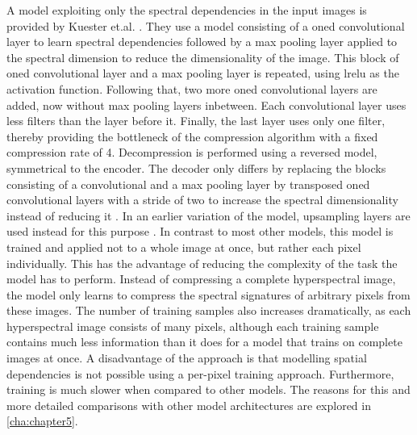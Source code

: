 A model exploiting only the spectral dependencies in the input images is provided by Kuester et.al. \citep{kuester_1d-convolutional_2021,kuester_transferability_2022}. They use a model consisting of a \ac{oned} convolutional layer to learn spectral dependencies followed by a max pooling layer applied to the spectral dimension to reduce the dimensionality of the image. This block of \ac{oned} convolutional layer and a max pooling layer is repeated, using \ac{lrelu} as the activation function. Following that, two more \ac{oned} convolutional layers are added, now without max pooling layers inbetween. Each convolutional layer uses less filters than the layer before it. Finally, the last layer uses only one filter, thereby providing the bottleneck of the compression algorithm with a fixed compression rate of 4. Decompression is performed using a reversed model, symmetrical to the encoder. The decoder only differs by replacing the blocks consisting of a convolutional and a max pooling layer by transposed \ac{oned} convolutional layers with a stride of two to increase the spectral dimensionality instead of reducing it \citep{kuester_transferability_2022}. In an earlier variation of the model, upsampling layers are used instead for this purpose \citep{kuester_1d-convolutional_2021}. In contrast to most other models, this model is trained and applied not to a whole image at once, but rather each pixel individually. This has the advantage of reducing the complexity of the task the model has to perform. Instead of compressing a complete hyperspectral image, the model only learns to compress the spectral signatures of arbitrary pixels from these images. The number of training samples also increases dramatically, as each hyperspectral image consists of many pixels, although each training sample contains much less information than it does for a model that trains on complete images at once. A disadvantage of the approach is that modelling spatial dependencies is not possible using a per-pixel training approach. Furthermore, training is much slower when compared to other models. The reasons for this and more detailed comparisons with other model architectures are explored in \autoref{cha:chapter5}.

